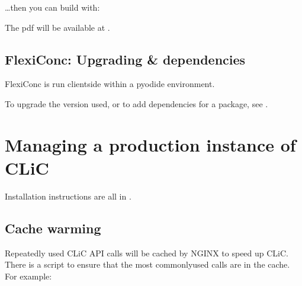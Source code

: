 \documentclass[letterpaper,10pt,english]{sphinxmanual}
\begin{document}
\begin{sphinxVerbatim}[commandchars=\\\{\}]
   \PYGZbs{}
             \PYGZbs{}
             \PYGZbs{}
\end{sphinxVerbatim}

\sphinxAtStartPar
…then you can build with:

\begin{sphinxVerbatim}[commandchars=\\\{\}]
   
\end{sphinxVerbatim}

\sphinxAtStartPar
The pdf will be available at .


\section{FlexiConc: Upgrading \& dependencies}
\label{\detokenize{advanced/development:flexiconc-upgrading-dependencies}}
\sphinxAtStartPar
FlexiConc is run client\sphinxhyphen{}side within a pyodide environment.

\sphinxAtStartPar
To upgrade the version used, or to add dependencies for a package, see .

\sphinxstepscope


\chapter{Managing a production instance of CLiC}
\label{\detokenize{advanced/production:managing-a-production-instance-of-clic}}\label{\detokenize{advanced/production::doc}}
\sphinxAtStartPar
Installation instructions are all in .


\section{Cache warming}
\label{\detokenize{advanced/production:cache-warming}}
\sphinxAtStartPar
Repeatedly used CLiC API calls will be cached by NGINX to speed up CLiC. There
is a script to ensure that the most commonly\sphinxhyphen{}used calls are in the cache. For
example:
\end{document}
